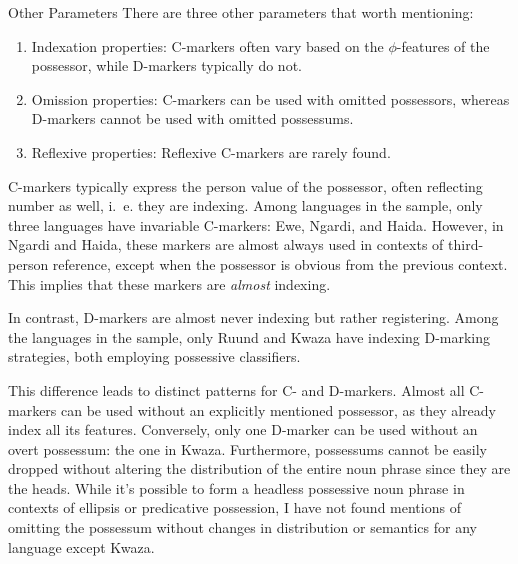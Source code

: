 \documentclass[12pt,aspectratio=169,t]{beamer}
\renewcommand{\'}{\textquotesingle}
\begin{document}
\begin{frame}[allowframebreaks,t]{Other Parameters}
	\small 
	There are three other parameters that worth mentioning:
	
	\begin{enumerate}
		\item Indexation properties: C-markers often vary based on the $\phi$-features of the possessor, while D-markers typically do not.
		\item Omission properties: C-markers can be used with omitted possessors, whereas D-markers cannot be used with omitted possessums.
		\item Reflexive properties: Reflexive C-markers are rarely found.
	\end{enumerate}
	
	
	C-markers typically express the person value of the possessor, often reflecting number as well, i.~e. they are indexing. Among languages in the sample, only three languages have invariable C-markers: Ewe, Ngardi, and Haida. However, in Ngardi and Haida, these markers are almost always used in contexts of third-person reference, except when the possessor is obvious from the previous context. This implies that these markers are \textit{almost} indexing.
	
	In contrast, D-markers are almost never indexing but rather registering. Among the languages in the sample, only Ruund and Kwaza have indexing D-marking strategies, both employing possessive classifiers.
	
	This difference leads to distinct patterns for C- and D-markers. Almost all C-markers can be used without an explicitly mentioned possessor, as they already index all its features. Conversely, only one D-marker can be used without an overt possessum: the one in Kwaza. Furthermore, possessums cannot be easily dropped without altering the distribution of the entire noun phrase since they are the heads. While it's possible to form a headless possessive noun phrase in contexts of ellipsis or predicative possession, I have not found mentions of omitting the possessum without changes in distribution or semantics for any language except Kwaza.
	
\end{frame}
\end{document}

